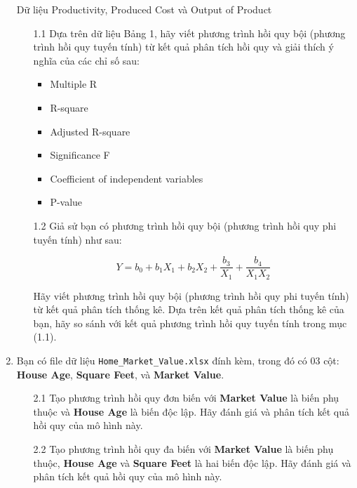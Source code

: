\begin{enumerate}
\begin{table}[!htp]
\caption{Dữ liệu Productivity, Produced Cost và Output of Product}
\label{fig:table1}

\end{table}

\begin{enumerate}

\item[1.1] Dựa trên dữ liệu Bảng 1, hãy viết phương trình hồi quy bội 
(phương trình hồi quy tuyến tính) từ kết quả phân tích hồi quy và 
giải thích ý nghĩa của các chỉ số sau:

\begin{itemize}
\item Multiple R
\item R-square
\item Adjusted R-square
\item Significance F
\item Coefficient of independent variables
\item P-value
\end{itemize}

\item[1.2] Giả sử bạn có phương trình hồi quy bội (phương trình hồi quy phi tuyến tính) như sau:

\[
Y = b_0 + b_1 X_1 + b_2 X_2 + \frac{b_3}{X_1} + \frac{b_4}{X_1 X_2}
\]

Hãy viết phương trình hồi quy bội (phương trình hồi quy phi tuyến tính) 
từ kết quả phân tích thống kê. Dựa trên kết quả phân tích thống kê của bạn, 
hãy so sánh với kết quả phương trình hồi quy tuyến tính trong mục (1.1).

\end{enumerate}

\item Bạn có file dữ liệu \texttt{Home\_Market\_Value.xlsx} đính kèm, trong đó 
có 03 cột: \textbf{House Age}, \textbf{Square Feet}, và \textbf{Market Value}.

\begin{enumerate}

\item[2.1] Tạo phương trình hồi quy đơn biến với \textbf{Market Value} là 
biến phụ thuộc và \textbf{House Age} là biến độc lập. Hãy đánh giá và phân tích 
kết quả hồi quy của mô hình này.

\item[2.2] Tạo phương trình hồi quy đa biến với \textbf{Market Value} là biến 
phụ thuộc, \textbf{House Age} và \textbf{Square Feet} là hai biến độc lập. 
Hãy đánh giá và phân tích kết quả hồi quy của mô hình này.


\end{enumerate}
\end{enumerate}
